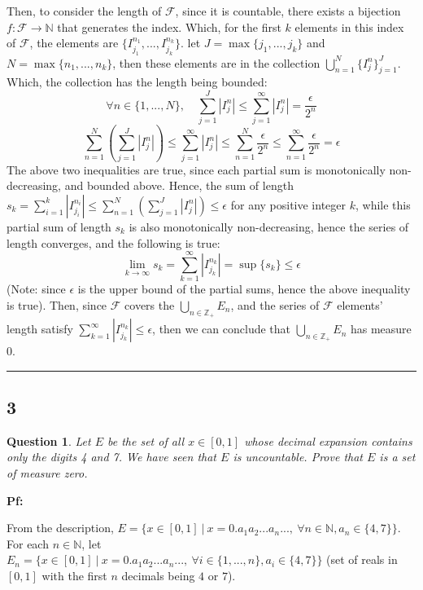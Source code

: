\documentclass{article}
\newtheorem{question}{Question}
\begin{document}
Then, to consider the length of $\mathcal{F}$, since it is countable, there exists a bijection $f:\mathcal{F}\rightarrow \mathbb{N}$ that generates the index.
Which, for the first $k$ elements in this index of $\mathcal{F}$, the elements are $\{I_{j_1}^{n_1},...,I_{j_k}^{n_k}\}$. let $J=\max\{j_1,...,j_k\}$ and $N=\max\{n_1,...,n_k\}$,
then these elements are in the collection $\bigcup_{n=1}^{N}\{I_j^n\}_{j=1}^{J}$. Which, the collection has the length being bounded:
$$\forall n\in\{1,...,N\},\quad \sum_{j=1}^{J}|I_j^n|\leq \sum_{j=1}^{\infty}|I_j^n|=\frac{\epsilon}{2^n}$$
$$\sum_{n=1}^{N}\left(\sum_{j=1}^{J}|I_j^n|\right) \leq \sum_{j=1}^{\infty}|I_j^n| \leq \sum_{n=1}^{N}\frac{\epsilon}{2^n}\leq \sum_{n=1}^{\infty}\frac{\epsilon}{2^n}=\epsilon$$
The above two inequalities are true, since each partial sum is monotonically non-decreasing, and bounded above.
Hence, the sum of length $s_k=\sum_{i=1}^{k}|I_{j_i}^{n_i}| \leq \sum_{n=1}^{N}\left(\sum_{j=1}^{J}|I_j^n|\right) \leq \epsilon$ for any positive integer $k$, while this partial sum of length $s_k$
is also monotonically non-decreasing, hence the series of length converges, and the following is true:
$$\lim_{k\rightarrow\infty}s_k=\sum_{k=1}^{\infty}|I_{j_k}^{n_k}| = \sup\{s_k\} \leq \epsilon$$
(Note: since $\epsilon$ is the upper bound of the partial sums, hence the above inequality is true).
Then, since $\mathcal{F}$ covers the $\bigcup_{n\in\mathbb{Z}_+}E_n$, and the series of $\mathcal{F}$ elements' length satisfy $\sum_{k=1}^{\infty}|I_{j_k}^{n_k}|\leq \epsilon$, then we can conclude that $\bigcup_{n\in\mathbb{Z}_+}E_n$ has measure $0$.

\hfill

\rule{15.5cm}{0.1mm}

\hfill

\subsection*{3}
\begin{myBox2}[]{}
    \begin{question}
        Let $ E$ be the set of all $x\in[0,1]$ whose decimal expansion contains
        only the digits 4 and 7. We have seen that $E$ is uncountable. Prove that $E$ is a
        set of measure zero.
    \end{question}
\end{myBox2}

\textbf{Pf:}

From the description, $E=\{x\in[0,1]\ |\ x=0.a_1a_2...a_n...,\ \forall n\in\mathbb{N}, a_n\in\{4,7\}\}$. 
For each $n\in\mathbb{N}$, let $E_n=\{x\in[0,1]\ |\ x=0.a_1a_2...a_n...,\ \forall i\in\{1,...,n\}, a_i\in\{4,7\}\}$ (set of reals in $[0,1]$ with the first $n$ decimals being $4$ or $7$).
\end{document}
